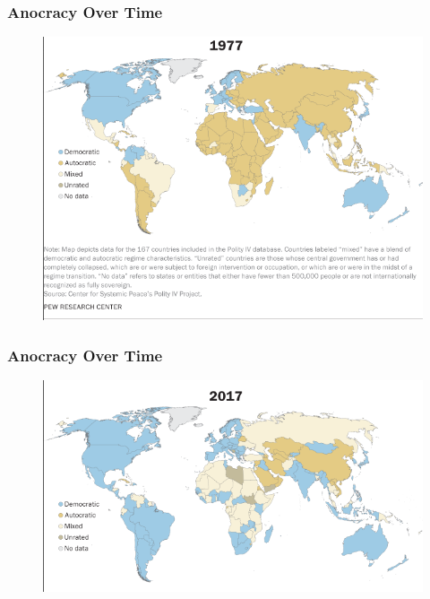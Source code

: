 \documentclass[handout]{beamer}
\begin{document}
\begin{frame} 
	\frametitle{\LARGE{Anocracy Over Time}}
	\begin{figure}[ht!]
		\centering
		\includegraphics[width=\textwidth,height=.9\textheight,keepaspectratio]{anocracy1.png}
	\end{figure}
\end{frame}

\begin{frame} 
	\frametitle{\LARGE{Anocracy Over Time}}
	\begin{figure}[ht!]
		\centering
		\includegraphics[width=\textwidth,height=\textheight,keepaspectratio]{anocracy2.png}
	\end{figure}
\end{frame}
\end{document}
